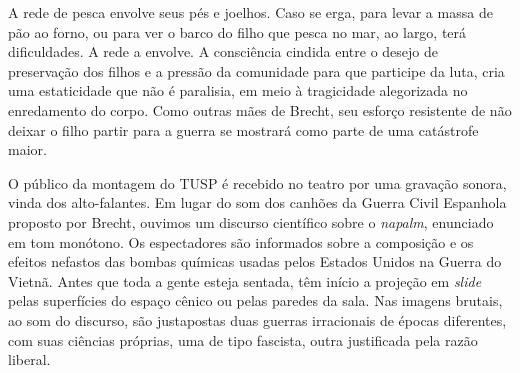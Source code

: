 A rede de pesca envolve seus pés e joelhos. Caso se erga, para levar a
massa de pão ao forno, ou para ver o barco do filho que pesca no mar, ao
largo, terá dificuldades. A rede a envolve. A consciência cindida entre
o desejo de preservação dos filhos e a pressão da comunidade para que
participe da luta, cria uma estaticidade que não é paralisia, em meio à
tragicidade alegorizada no enredamento do corpo. Como outras mães de
Brecht, seu esforço resistente de não deixar o filho partir para a
guerra se mostrará como parte de uma catástrofe maior.

O público da montagem do TUSP é recebido no teatro por uma gravação
sonora, vinda dos alto-falantes. Em lugar do som dos canhões da Guerra
Civil Espanhola proposto por Brecht, ouvimos um discurso científico
sobre o \textit{napalm}, enunciado em tom monótono. Os espectadores são
informados sobre a composição e os efeitos nefastos das bombas químicas
usadas pelos Estados Unidos na Guerra do Vietnã. Antes que toda a gente
esteja sentada, têm início a projeção em \textit{slide} pelas superfícies
do espaço cênico ou pelas paredes da sala. Nas imagens brutais, ao som
do discurso, são justapostas duas guerras irracionais de épocas
diferentes, com suas ciências próprias, uma de tipo fascista, outra
justificada pela razão liberal.

